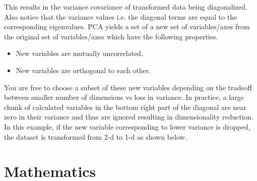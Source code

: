 \documentclass[11pt, a4paper]{article}
\begin{document}
This results in the variance covariance of transformed data being diagonalized. Also notice that the variance values i.e. the diagonal terms are equal to the corresponding eigenvalues. PCA yields a set of a new set of variables/axes from the original set of variables/axes which have the following properties.


\begin{itemize}
	\item New variables are mutually uncorrelated.
	\item New variables are orthogonal to each other.
\end{itemize}

You are free to choose a subset of these new variables depending on the tradeoff between smaller number of dimensions vs loss in variance. In practice, a large chunk of calculated variables in the bottom right part of the diagonal are near zero in their variance and thus are ignored resulting in dimensionality reduction. 
In this example, if the new variable corresponding to lower variance is dropped, the dataset is transformed from 2-d to 1-d as shown below.


\begin{figure}[htbp]
	\centering
\end{figure}

\section{Mathematics}
\end{document}
